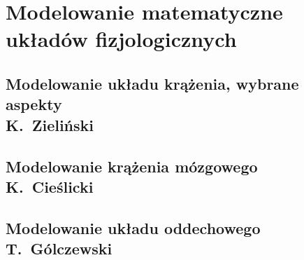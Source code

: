 \documentclass[11pt,a4paper,twoside,openright,final]{memoir}
\begin{document}

	\frontmatter
	
	\begin{KeepFromToc}
		
		\tableofcontents
	\end{KeepFromToc}


	\mainmatter
	\pagestyle{ruled}
		
		\part{Modelowanie matematyczne układów fizjologicznych}
			
			
			
			\chapter[Modelowanie układu krążenia, wybrane aspekty]{Modelowanie układu krążenia, wybrane aspekty\\{\Large K.~Zieliński}}
			
			\chapter[Modelowanie krążenia mózgowego]{Modelowanie krążenia mózgowego\\{\Large K.~Cieślicki}}
			
			\chapter[Modelowanie układu oddechowego]{Modelowanie układu oddechowego\\{\Large T.~Gólczewski}}
			
\end{document}
